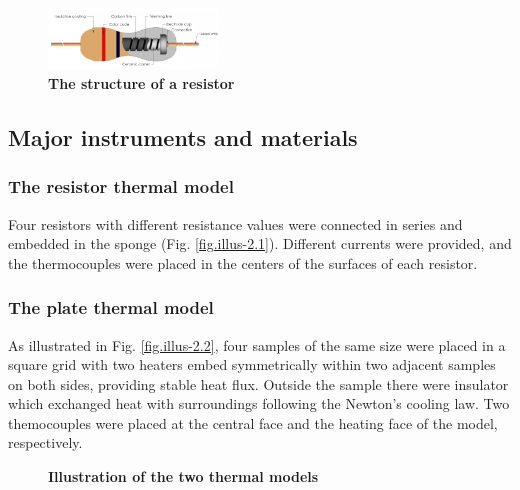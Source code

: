\documentclass[10pt,a4paper,twocolumn,twoside,UTF8]{article}
\begin{document}
		\begin{figure}[htbp]
			\centering
			\includegraphics[width=0.4\textwidth]{attachments/fig.illus-1.3.png}
			\caption{\textbf{The structure of a resistor}}
			\label{fig.illus-1.3}
		\end{figure}

	\subsection{Major instruments and materials}
		\subsubsection{The resistor thermal model}
		Four resistors with different resistance values were connected in series and embedded in the sponge (Fig. \ref{fig.illus-2.1}). 
		Different currents were provided, and the thermocouples were placed in the centers of the surfaces of each resistor. 

		\subsubsection{The plate thermal model}
		As illustrated in Fig. \ref{fig.illus-2.2}, four samples of the same size were placed in a square grid with two heaters embed symmetrically within
		two adjacent samples on both sides, providing stable heat flux. Outside the sample there were insulator which exchanged heat with surroundings following the Newton's cooling law.
		Two themocouples were placed at the central face and the heating face of the model, respectively.
		
		\begin{figure}[htbp]
			\centering
			\caption{\textbf{Illustration of the two thermal models}}
		\end{figure}
\end{document}
